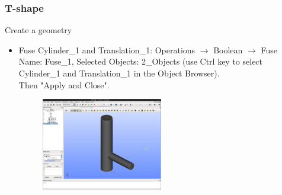 \documentclass[10pt]{beamer}
\begin{document}
\begin{frame}
\frametitle{T-shape}
\begin{block}{Create a geometry}

\begin{itemize}
\item Fuse Cylinder\_1 and Translation\_1: Operations $\rightarrow$ Boolean $\rightarrow$ Fuse\\
Name: Fuse\_1, Selected Objects: 2\_Objects (use Ctrl key to select Cylinder\_1 and Translation\_1 in the Object Browser). \\
Then "Apply and Close".

\begin{figure}
\includegraphics[width=0.5\textwidth]{PICTURES/salome14.jpg}
\end{figure}

\end{itemize}

\end{block}
\end{frame}
\end{document}
